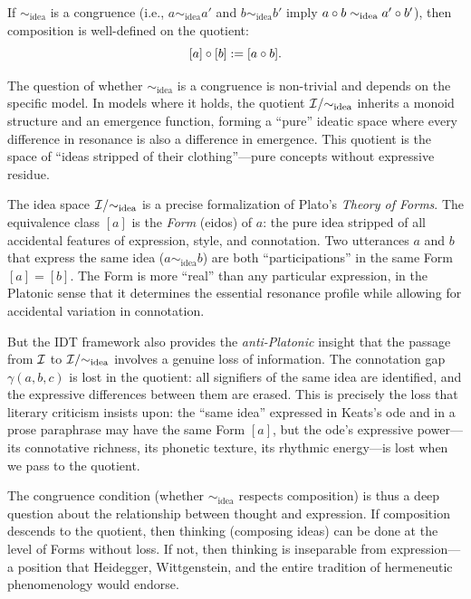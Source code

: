 \begin{proposition}
If $\sim_{\mathrm{idea}}$ is a congruence (i.e., $a \sim_{\mathrm{idea}} a'$
and $b \sim_{\mathrm{idea}} b'$ imply $a \circ b \sim_{\mathrm{idea}}
a' \circ b'$), then composition is well-defined on the quotient:
\[
    [a] \circ [b] := [a \circ b].
\]
\end{proposition}

\begin{remark}
The question of whether $\sim_{\mathrm{idea}}$ is a congruence is
non-trivial and depends on the specific model. In models where it holds,
the quotient $\mathcal{I} / {\sim_{\mathrm{idea}}}$ inherits a monoid structure
and an emergence function, forming a ``pure'' ideatic space where every
difference in resonance is also a difference in emergence. This quotient
is the space of ``ideas stripped of their clothing''---pure concepts
without expressive residue.
\end{remark}

\begin{interpretation}\label{interp:ch6:quotient_plato}
The idea space $\mathcal{I} / {\sim_{\text{idea}}}$ is a precise formalization
of Plato's \emph{Theory of Forms}. The equivalence class $[a]$ is the
\emph{Form} (eidos) of $a$: the pure idea stripped of all accidental
features of expression, style, and connotation. Two utterances $a$ and $b$
that express the same idea ($a \sim_{\text{idea}} b$) are both
``participations'' in the same Form $[a] = [b]$. The Form is more
``real'' than any particular expression, in the Platonic sense that it
determines the essential resonance profile while allowing for accidental
variation in connotation.

But the IDT framework also provides the \emph{anti-Platonic} insight
that the passage from $\mathcal{I}$ to $\mathcal{I} / {\sim_{\text{idea}}}$ involves a
genuine loss of information. The connotation gap $\gamma(a, b, c)$ is
lost in the quotient: all signifiers of the same idea are identified,
and the expressive differences between them are erased. This is precisely
the loss that literary criticism insists upon: the ``same idea'' expressed
in Keats's ode and in a prose paraphrase may have the same Form $[a]$,
but the ode's expressive power---its connotative richness, its phonetic
texture, its rhythmic energy---is lost when we pass to the quotient.

The congruence condition (whether $\sim_{\text{idea}}$ respects composition)
is thus a deep question about the relationship between thought and
expression. If composition descends to the quotient, then thinking
(composing ideas) can be done at the level of Forms without loss. If
not, then thinking is inseparable from expression---a position that
Heidegger, Wittgenstein, and the entire tradition of hermeneutic
phenomenology would endorse.
\end{interpretation}

